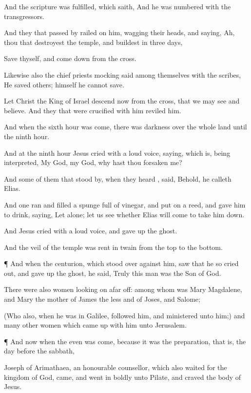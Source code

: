 {And the
scripture was
fulfilled,
which
saith,
And he was
numbered
with the
transgressors.

And they
that passed
by railed
on
him,
wagging
their
heads,
and
saying,
Ah, thou
that
destroyest the
temple,
and
buildest
{}
in
three
days,

Save
thyself,
and come
down
from the
cross.

Likewise
also the chief
priests
mocking
said
among
themselves
with the
scribes, He
saved
others;
himself he
cannot
save.

Let
Christ the
King of
Israel
descend
now
from the
cross,
that we may
see
and
believe.
And they
that were
crucified with
him
reviled
him.

And when the
sixth
hour was
come, there
was
darkness
over the
whole
land
until the
ninth
hour.

And at the
ninth
hour
Jesus
cried with a
loud
voice,
saying,
{}
which
is, being
interpreted,
My
God,
my
God,
why hast thou
forsaken
me?

And
some of them
that stood
by, when they
heard
{},
said,
Behold, he
calleth
Elias.

And
one
ran
and
filled a
spunge
full of
vinegar,
and
put
{} on a
reed, and
gave
him to
drink,
saying, Let
alone; let us
see
whether
Elias will
come to
take
him
down.

And
Jesus
cried with a
loud
voice, and gave up the
ghost.

And the
veil of the
temple was
rent
in
twain
from the
top
to the
bottom.


\par }{\PP {}¶
And when the
centurion,
which
stood
over
against
him,
saw
that
he
so cried
out, and gave up the
ghost, he
said,
Truly
this
man
was the
Son of
God.

There
were
also
women looking
on
afar
off:
among
whom
was
Mary
Magdalene,
and
Mary the
mother of
James the
less
and of
Joses,
and
Salome;

(Who
also,
when he
was
in
Galilee,
followed
him,
and
ministered unto
him;)
and
many other
women
which came
up with
him
unto
Jerusalem.


\par }{\PP {}¶
And
now when the
even was
come,
because it
was the
preparation,
that
is, the day before the
sabbath,

Joseph
of
Arimathaea, an
honourable
counsellor,
which
also waited
for the
kingdom of
God,
came, and went
in
boldly
unto
Pilate,
and
craved the
body of
Jesus.

}
